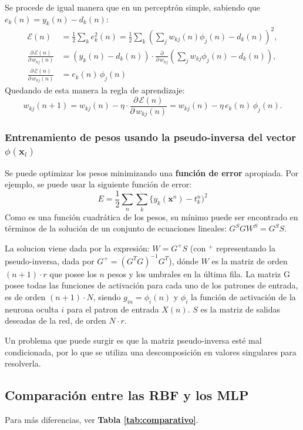 \documentclass[10pt,a4paper]{article}
\begin{document}
Se procede de igual manera que en un perceptrón simple, sabiendo que $e_k(n) = y_k(n)-d_k(n)$:
\begin{align*}
\mathcal{E}(n) 
&= \frac{1}{2} \sum_k e^2_k(n) = \frac{1}{2} \sum_k \left(\sum_j w_{kj}(n)\phi_j(n)-d_k(n)\right)^2 ,\\
\frac{\partial\,\mathcal{E}(n)}{\partial\,w_{kj}(n)} 
&= (y_k(n) - d_k(n))\cdot \frac{\partial}{\partial\, w_{kj}} \left(\sum_j w_{kj} \phi_j(n) - d_k(n)\right), \\
\frac{\partial\,\mathcal{E}(n)}{\partial\, w_{kj}(n)} 
&= e_k(n)\, \phi_j(n)
\end{align*}
Quedando de esta manera la regla de aprendizaje:
\[
w_{kj}(n+1) = w_{kj}(n) -\eta \cdot \frac{\partial\,\mathcal{E}(n)}{\partial\, w_{kj}(n)}  = w_{kj}(n) -\eta \, e_k(n) \, \phi_j(n).
\]

\subsubsection{Entrenamiento de pesos usando la pseudo-inversa del vector $\phi(\mathbf{x}_l)$}
Se puede optimizar los pesos minimizando una \textbf{función de error} apropiada. Por ejemplo, se puede usar la siguiente función de error:
\[
E=\frac{1}{2}\sum_n\sum_k \{y_k(\mathbf{x}^n)- t_k^n)^2
\]
Como es una función cuadrática de los pesos, su mínimo puede ser encontrado en términos de la solución de un conjunto de ecuaciones lineales: $G^S G W^S = G^S S$.

La solucion viene dada por la expresión: $W = G^{+} S$ (con $^+$ representando la pseudo-inversa, dada por $G^+=(G^T G)^{-1}G^T$), dónde $W$ es la matriz de orden $(n+1)\cdot r$ que posee los $n$ pesos y los umbrales en la última fila. La matriz G posee todas las funciones de activación para cada uno de los patrones de entrada, es de orden $(n+1)\cdot N$, siendo $g_{in} = \phi_i(n)$ y $\phi_i$ la función de activación de la neurona oculta $i$ para el patron de entrada $X(n)$. $S$ es la matriz de salidas deseadas de la red, de orden $N\cdot r$.

Un problema que puede surgir es que la matriz pseudo-inversa esté mal condicionada, por lo que se utiliza una descomposición en valores singulares para resolverla.

\subsection{Comparación entre las RBF y los MLP}
Para más diferencias, ver \textbf{Tabla \ref{tab:comparativo}}.
\end{document}
